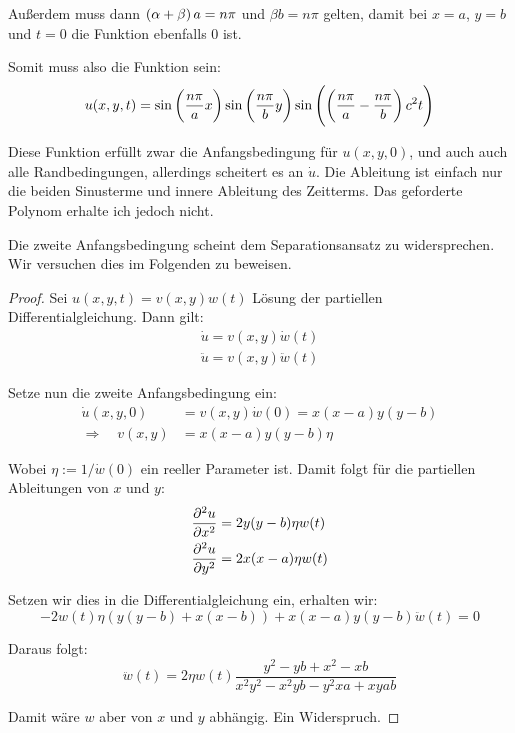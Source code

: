 \documentclass[11pt, ngerman, fleqn]{article}
\begin{document}
Außerdem muss dann $\del{\alpha + \beta} a = n \pi$ und $\beta b = n \pi$
gelten, damit bei $x=a$, $y=b$ und $t=0$ die Funktion ebenfalls $0$ ist.

Somit muss also die Funktion sein:
\[
	u(x, y, t)
	= \sin\del{\frac{n\pi}a x}
	\sin\del{\frac{n\pi}b y}
	\sin\del{\del{\frac{n\pi}a - \frac{n\pi}b} c^2 t}
\]

Diese Funktion erfüllt zwar die Anfangsbedingung für $u(x, y, 0)$, und auch
auch alle Randbedingungen, allerdings scheitert es an $\dot u$. Die Ableitung
ist einfach nur die beiden Sinusterme und innere Ableitung des Zeitterms. Das
geforderte Polynom erhalte ich jedoch nicht.

Die zweite Anfangsbedingung scheint dem Separationsansatz zu widersprechen. Wir
versuchen dies im Folgenden zu beweisen.

\begin{proof}
	Sei $u(x, y, t)=v(x, y)w(t)$ Lösung der partiellen Differentialgleichung.
	Dann gilt:
	\begin{align*}
		\dot u=v(x, y) \dot w(t) \\
		\ddot u=v(x, y) \ddot w(t)
	\end{align*}

	Setze nun die zweite Anfangsbedingung ein:
	\begin{align*}
		\dot u(x, y, 0)&=v(x, y) \dot w(0)=x(x-a)y(y-b) \\
\Rightarrow \quad v(x, y)&= x(x-a)y(y-b)\eta
	\end{align*}

	Wobei $\eta := 1/ \dot w(0)$ ein reeller Parameter ist. Damit folgt für die partiellen
	Ableitungen von $x$ und $y$:
	\begin{align*}
		\dpd[2] ux&=2y(y-b)\eta w(t) \\
	 \dpd[2] uy&=2x(x-a)\eta w(t)
	\end{align*}

	Setzen wir dies in die Differentialgleichung ein, erhalten wir:
	\[
		-2w(t)\eta (y(y-b)+x(x-b))+x(x-a)y(y-b) \ddot w(t) =0
	\]

	Daraus folgt:
	\[
		\ddot w(t) = 2 \eta w(t)\frac{y^2-yb+x^2-xb}{x^2y^2-x^2yb-y^2xa+xyab}
	\]

	Damit wäre $w$ aber von $x$ und $y$ abhängig. Ein Widerspruch.
\end{proof}

\end{document}
